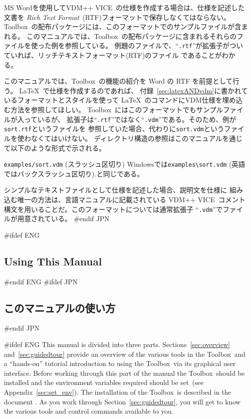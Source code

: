 \documentclass[\pformat,12pt]{article}
\newcommand{\vdmslpp}{VDM-SL}
\newcommand{\Toolbox}{Toolbox}
\newcommand{\vdmext}{vdm}
\newcommand{\vdmslpp}{VDM++}
\newcommand{\Toolbox}{Toolbox}
\renewcommand{\vdmslpp}{VDM++ VICE}
\newcommand{\vdmext}{vpp}
\begin{document}
MS Wordを使用して\vdmslpp\ の仕様を作成する場合は、仕様を記述した文書を
{\em Rich Text Format\/}~(RTF)フォーマットで保存しなくてはならない。
\Toolbox\ の配布パッケージには、このフォーマットでのサンプルファイルが含まれる。
このマニュアルでは、\Toolbox\ の配布パッケージに含まれるそれらのファイルを使った例を参照している。
例題のファイルで、``{\tt .rtf}''が拡張子がついていれば、リッチテキストフォーマット(RTF)のファイル
であることがわかる。

このマニュアルでは、\Toolbox\ の機能の紹介を Word の RTF を前提として行う。
\LaTeX\ で仕様を作成するのであれば、
付録~\ref{sec:latexANDvdm}に書かれているフォーマットとスタイルを使って
\LaTeX\ のコマンドにVDM仕様を埋め込む方法を参照してほしい。
\Toolbox\ にはこのフォーマットでもサンプルファイルが入っているが、
拡張子は``{\tt .rtf}''ではなく``{\tt .\vdmext}''である。そのため、例が{\tt sort.rtf}というファイルを
参照していた場合、代わりに{\tt sort.\vdmext}というファイルを使わなくてはいけない。
ディレクトリ構造の参照はこのマニュアルを通じて以下のような形式で示される。

{\tt examples/sort.vdm} (スラッシュ区切り)  
Windowsでは\verb+examples\sort.vdm+ (英語ではバックスラッシュ区切り).と同じである。

シンプルなテキストファイルとして仕様を記述した場合、説明文を仕様に
組み込む唯一の方法は、言語マニュアルに記載されている
\vdmslpp\ コメント構文を用いることだ。このフォーマットについては通常拡張子
``{\tt .\vdmext}''でファイルが用意されている。
#endif JPN

#ifdef ENG
\subsection*{Using This Manual}
#endif ENG
#ifdef JPN
\subsection*{このマニュアルの使い方}
#endif JPN

#ifdef ENG
This manual is divided into three parts. Sections~\ref{sec:overview}
and~\ref{sec:guidedtour} provide an overview of the various tools in
the \Toolbox\ and a ``hands-on'' tutorial introduction to using the
\Toolbox\ via its graphical user interface.  Before working through
this part of the manual the \Toolbox\ should be installed and the
environment variables required should be set~(see
Appendix~\ref{sec:set_env}). The installation of the \Toolbox\ is
described in the document
.
As you work through Section~\ref{sec:guidedtour}, you will get to know
the various tools and control commands available to you.
\end{document}
